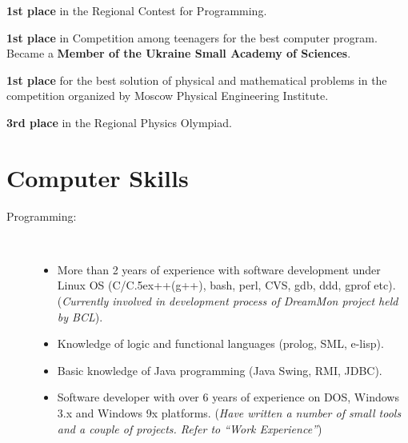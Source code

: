 \documentclass[10pt,overlapped,line]{res}
\def\Cplusplus{{\rm C\raise.5ex\hbox{\small ++}}}
\newcommand{\mplace}[1]{\textbf{#1}}
\newcommand{\wdescription}[1]{({\small \textit{#1}})}
\begin{document}
\begin{resume}
\begin{position}
\mplace{1st place} in the Regional Contest for Programming.
\end{position}

\begin{position}
  \mplace{1st place} in Competition among teenagers for the best
  computer program. Became a \mplace{Member of the Ukraine Small Academy
    of Sciences}.
\end{position}

\begin{position}
  \mplace{1st place} for the best solution of physical and mathematical
  problems in the competition organized by Moscow Physical Engineering Institute.
\end{position}

\begin{position}
  \mplace{3rd place} in the Regional Physics Olympiad.

\end{position}

\section{Computer Skills}
 \begin{description}
   \item[Programming:] \hspace*{\fill} \\
     \begin{itemize}
     \item More than 2 years of experience with software development
       under Linux OS (C/\Cplusplus(g++), bash, perl, CVS, gdb, ddd,
       gprof etc).  \wdescription{Currently involved in development
         process of DreamMon project held by BCL}.

     \item Knowledge of logic and functional languages (prolog, SML, e-lisp).

     \item Basic knowledge of Java programming (Java Swing, RMI,
       JDBC).

     \item Software developer with over 6 years of experience on DOS,
       Windows 3.x and Windows 9x platforms.
       \wdescription{Have written a number of small tools and a couple of
         projects. Refer to ``Work Experience''}
     

\end{itemize}
\end{description}
\end{resume}
\end{document}

